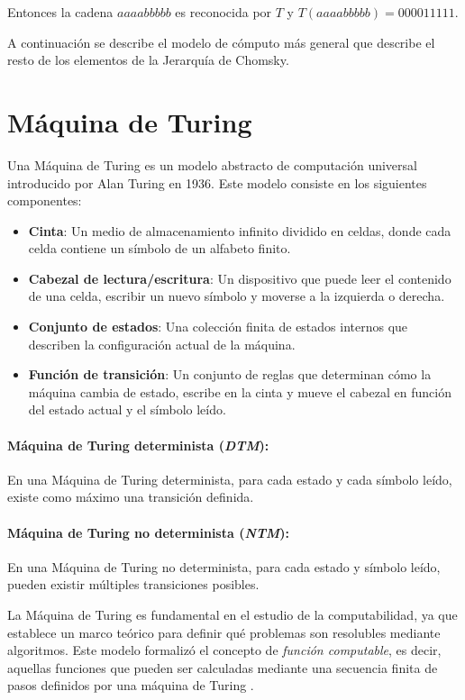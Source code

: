 \documentclass[12pt]{article}
\begin{document}
Entonces la cadena $aaaabbbbb$ es reconocida por $T$ y $T(aaaabbbbb)=000011111$.

A continuación se describe el modelo de cómputo más general que describe el resto de los elementos de la Jerarquía de Chomsky.

\section{Máquina de Turing}

Una Máquina de Turing \cite{authomataTheory} es un modelo abstracto de computación universal introducido por Alan Turing en 1936. Este modelo consiste en los siguientes componentes:

\begin{itemize}
      \item \textbf{Cinta}: Un medio de almacenamiento infinito dividido en celdas, donde cada celda contiene un símbolo de un alfabeto finito.
      \item \textbf{Cabezal de lectura/escritura}: Un dispositivo que puede leer el contenido de una celda, escribir un nuevo símbolo y moverse a la izquierda o derecha.
      \item \textbf{Conjunto de estados}: Una colección finita de estados internos que describen la configuración actual de la máquina.
      \item \textbf{Función de transición}: Un conjunto de reglas que determinan cómo la máquina cambia de estado, escribe en la cinta y mueve el cabezal en función del estado actual y el símbolo leído.
\end{itemize}

\paragraph{Máquina de Turing determinista (\textit{DTM}):}
En una Máquina de Turing determinista, para cada estado y cada símbolo leído, existe como máximo una transición
definida.
\paragraph{Máquina de Turing no determinista (\textit{NTM}):}
En una Máquina de Turing no determinista, para cada estado y símbolo leído, pueden existir múltiples
transiciones posibles.

La Máquina de Turing es fundamental en el estudio de la computabilidad, ya que establece un marco teórico 
para definir qué problemas son resolubles mediante algoritmos. Este modelo formalizó el concepto de 
\textit{función computable}, es decir, aquellas funciones que pueden ser calculadas mediante una secuencia 
finita de pasos definidos por una máquina de Turing \cite{authomataTheory}.
\end{document}
